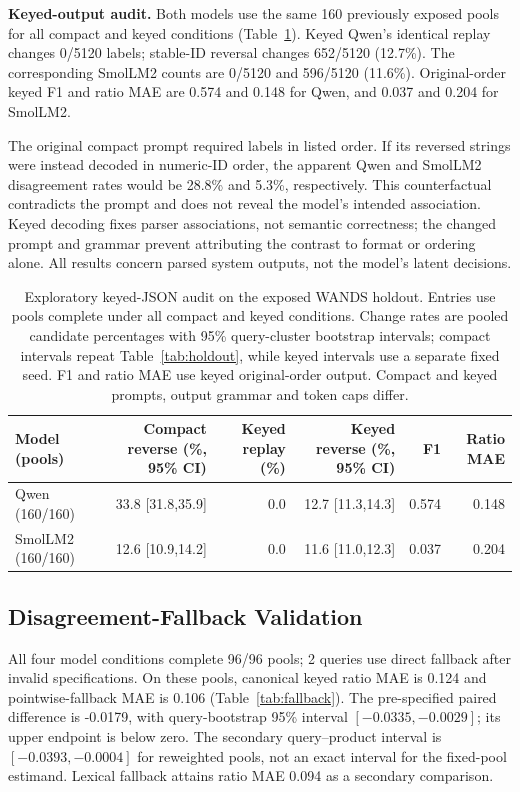 \documentclass[conference]{IEEEtran}
\begin{document}
\textbf{Keyed-output audit.}
Both models use the same 160 previously exposed pools for all compact and keyed conditions (Table~\ref{tab:keyed}). Keyed Qwen's identical replay changes 0/5120 labels; stable-ID reversal changes 652/5120 (12.7\%). The corresponding SmolLM2 counts are 0/5120 and 596/5120 (11.6\%). Original-order keyed F1 and ratio MAE are 0.574 and 0.148 for Qwen, and 0.037 and 0.204 for SmolLM2.

The original compact prompt required labels in listed order. If its reversed strings were instead decoded in numeric-ID order, the apparent Qwen and SmolLM2 disagreement rates would be 28.8\% and 5.3\%, respectively. This counterfactual contradicts the prompt and does not reveal the model's intended association. Keyed decoding fixes parser associations, not semantic correctness; the changed prompt and grammar prevent attributing the contrast to format or ordering alone. All results concern parsed system outputs, not the model's latent decisions.

\begin{table}[t]
\caption{Exploratory keyed-JSON audit on the exposed WANDS holdout. Entries use pools complete under all compact and keyed conditions. Change rates are pooled candidate percentages with 95\% query-cluster bootstrap intervals; compact intervals repeat Table~\ref{tab:holdout}, while keyed intervals use a separate fixed seed. F1 and ratio MAE use keyed original-order output. Compact and keyed prompts, output grammar and token caps differ.}
\label{tab:keyed}
\centering\small
\begin{tabular}{lrrrrr}
\toprule
Model (pools) & Compact reverse (\%, 95\% CI) & Keyed replay (\%) & Keyed reverse (\%, 95\% CI) & F1 & Ratio MAE \\
\midrule
Qwen (160/160) & 33.8 [31.8,35.9] & 0.0 & 12.7 [11.3,14.3] & 0.574 & 0.148 \\
SmolLM2 (160/160) & 12.6 [10.9,14.2] & 0.0 & 11.6 [11.0,12.3] & 0.037 & 0.204 \\
\bottomrule
\end{tabular}
\end{table}

\subsection{Disagreement-Fallback Validation}
All four model conditions complete 96/96 pools; 2 queries use direct fallback after invalid specifications. On these pools, canonical keyed ratio MAE is 0.124 and pointwise-fallback MAE is 0.106 (Table~\ref{tab:fallback}). The pre-specified paired difference is -0.0179, with query-bootstrap 95\% interval $[-0.0335,-0.0029]$; its upper endpoint is below zero. The secondary query--product interval is $[-0.0393,-0.0004]$ for reweighted pools, not an exact interval for the fixed-pool estimand. Lexical fallback attains ratio MAE 0.094 as a secondary comparison.
\end{document}
